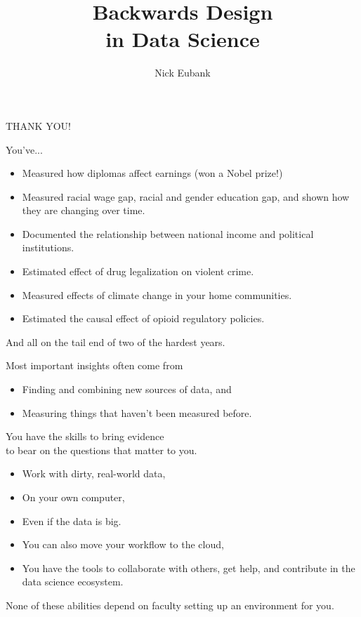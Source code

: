 \documentclass[11pt]{beamer}
\title{Backwards Design \\ in Data Science}
\author{\small Nick Eubank}
\date{\vspace*{.3in} \date}
\begin{document}
\begin{frame}[c]
\centering
\pause THANK YOU!
\end{frame}

\begin{frame}[c]{}
You've...
  \begin{itemize}
    \item Measured how diplomas affect earnings (won a Nobel prize!)
    \pause \item Measured racial wage gap, racial and gender education gap, and shown how they are changing over time.
    \pause \item Documented the relationship between national income and political institutions.
    \pause \item Estimated effect of drug legalization on violent crime.
    \pause \item Measured effects of climate change in your home communities.
    \pause \item Estimated the causal effect of opioid regulatory policies.
  \end{itemize}
  \pause 
And all on the tail end of two of the hardest years.
\end{frame}

\begin{frame}[c]{}
Most important insights often come from
\begin{itemize}
  \pause \item Finding and combining new sources of data, and
  \pause \item Measuring things that haven't been measured before.
\end{itemize}
\end{frame}

\begin{frame}[c]{}
\begin{center}
  You have the skills to bring evidence \\
  to bear \alert{on the questions that matter to you.}

\end{center}

\begin{itemize}
  \pause \item Work with dirty, real-world data,
  \pause \item On your own computer,
  \pause \item Even if the data is big.
  \pause \item You can also move your workflow to the cloud,
  \pause \item You have the tools to collaborate with others, get help, and contribute in the data science ecosystem.
\end{itemize}
\vspace*{0.2cm}
\pause \alert{None} of these abilities depend on faculty setting up an environment for you.\\
\end{frame}
\end{document}
